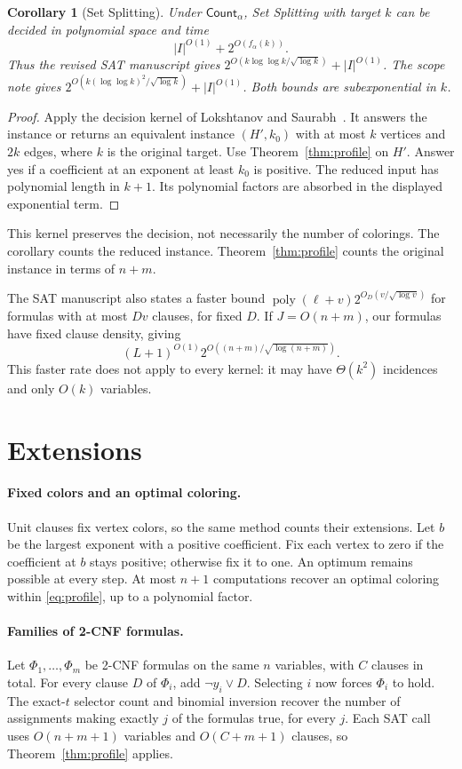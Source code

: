 \documentclass[11pt]{article}
\newtheorem{corollary}[theorem]{Corollary}
\theoremstyle{definition}
\newcommand{\poly}{\operatorname{poly}}
\newcommand{\Count}{\mathsf{Count}}
\begin{document}
\begin{corollary}[Set Splitting]\label{cor:parameter}
Under $\Count_\alpha$, Set Splitting with target $k$ can be decided in
polynomial space and time
\[
 |I|^{O(1)}+2^{O(f_\alpha(k))}.
\]
Thus the revised SAT manuscript gives
$2^{O(k\log\log k/\sqrt{\log k})}+|I|^{O(1)}$.
The scope note gives
$2^{O(k(\log\log k)^2/\sqrt{\log k})}+|I|^{O(1)}$.
Both bounds are subexponential in $k$.
\end{corollary}
\begin{proof}
Apply the decision kernel of Lokshtanov and Saurabh~\cite[Theorem~1]{LS09}.
It answers the instance or returns an equivalent instance $(H',k_0)$
with at most $k$ vertices and $2k$ edges, where $k$ is the original target.
Use Theorem~\ref{thm:profile} on $H'$.
Answer yes if a coefficient at an exponent at least $k_0$ is positive.
The reduced input has polynomial length in $k+1$.
Its polynomial factors are absorbed in the displayed exponential term.
\end{proof}

This kernel preserves the decision, not necessarily the number of
colorings. The corollary counts the reduced instance.
Theorem~\ref{thm:profile} counts the original instance in terms of $n+m$.

The SAT manuscript also states a faster bound
$\poly(\ell+v)2^{O_D(v/\sqrt{\log v})}$ for formulas with at most $Dv$
clauses, for fixed $D$.
If $J=O(n+m)$, our formulas have fixed clause density, giving
\[
 (L+1)^{O(1)}2^{O((n+m)/\sqrt{\log(n+m)})}.
\]
This faster rate does not apply to every kernel: it may have
$\Theta(k^2)$ incidences and only $O(k)$ variables.

\section{Extensions}

\paragraph{Fixed colors and an optimal coloring.}
Unit clauses fix vertex colors, so the same method counts their extensions.
Let $b$ be the largest exponent with a positive coefficient.
Fix each vertex to zero if the coefficient at $b$ stays positive; otherwise
fix it to one. An optimum remains possible at every step.
At most $n+1$ computations recover an optimal coloring within
\eqref{eq:profile}, up to a polynomial factor.

\paragraph{Families of 2-CNF formulas.}
Let $\Phi_1,\ldots,\Phi_m$ be 2-CNF formulas on the same $n$ variables,
with $C$ clauses in total.
For every clause $D$ of $\Phi_i$, add $\neg y_i\vee D$.
Selecting $i$ now forces $\Phi_i$ to hold.
The exact-$t$ selector count and binomial inversion recover the number
of assignments making exactly $j$ of the formulas true, for every $j$.
Each SAT call uses $O(n+m+1)$ variables and $O(C+m+1)$ clauses, so
Theorem~\ref{thm:profile} applies.
\end{document}
